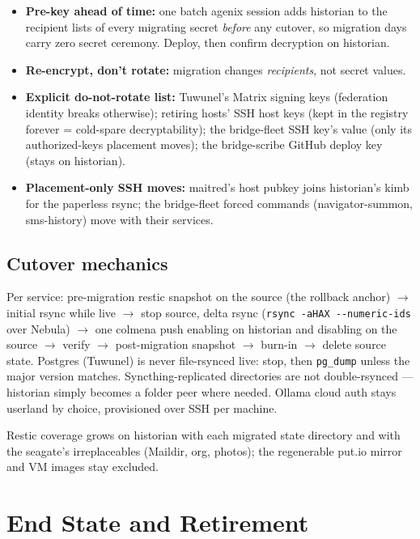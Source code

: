 \documentclass[11pt,letterpaper,headings=small]{scrartcl}
\begin{document}
\begin{itemize}
  \item \textbf{Pre-key ahead of time:} one batch agenix session adds
        historian to the recipient lists of every migrating secret
        \emph{before} any cutover, so migration days carry zero secret
        ceremony. Deploy, then confirm decryption on historian.
  \item \textbf{Re-encrypt, don't rotate:} migration changes
        \emph{recipients}, not secret values.
  \item \textbf{Explicit do-not-rotate list:} Tuwunel's Matrix signing
        keys (federation identity breaks otherwise); retiring hosts' SSH
        host keys (kept in the registry forever = cold-spare
        decryptability); the bridge-fleet SSH key's value (only its
        authorized-keys placement moves); the bridge-scribe GitHub
        deploy key (stays on historian).
  \item \textbf{Placement-only SSH moves:} maitred's host pubkey joins
        historian's kimb for the paperless rsync; the bridge-fleet
        forced commands (navigator-summon, sms-history) move with their
        services.
\end{itemize}

\subsection{Cutover mechanics}

Per service: pre-migration restic snapshot on the source (the rollback
anchor) $\rightarrow$ initial rsync while live $\rightarrow$ stop source,
delta rsync (\texttt{rsync -aHAX -{}-numeric-ids} over Nebula) $\rightarrow$
one colmena push enabling on historian and disabling on the source
$\rightarrow$ verify $\rightarrow$ post-migration snapshot $\rightarrow$
burn-in $\rightarrow$ delete source state. Postgres (Tuwunel) is never
file-rsynced live: stop, then \texttt{pg\_dump} unless the major version
matches. Syncthing-replicated directories are not double-rsynced ---
historian simply becomes a folder peer where needed. Ollama cloud auth
stays userland by choice, provisioned over SSH per machine.

Restic coverage grows on historian with each migrated state directory and
with the seagate's irreplaceables (Maildir, org, photos); the
regenerable put.io mirror and VM images stay excluded.

\section{End State and Retirement}
\end{document}
